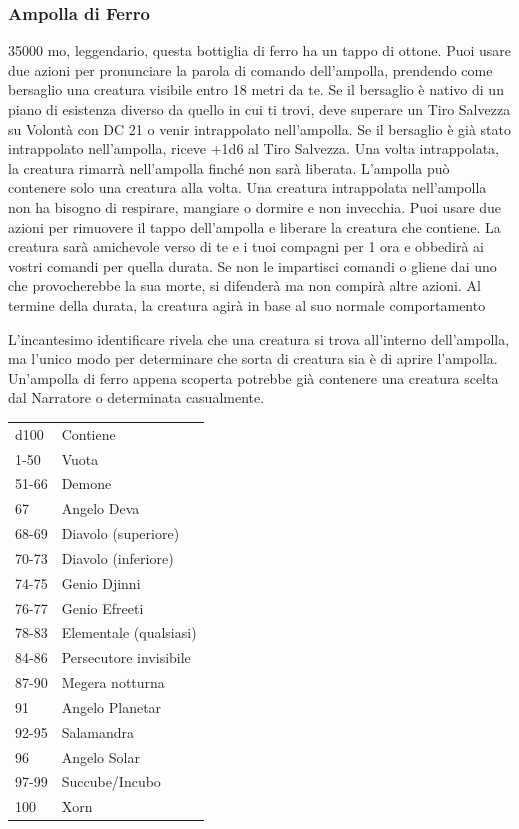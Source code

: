 \begin{multicols}{2}
\subsubsection*{Ampolla di Ferro}
35000 mo, leggendario, questa bottiglia di ferro ha un tappo di ottone. Puoi usare due azioni per pronunciare la parola di comando dell'ampolla, prendendo come bersaglio una creatura visibile entro 18 metri da te. Se il bersaglio è nativo di un piano di esistenza diverso da quello in cui ti trovi, deve superare un Tiro Salvezza su Volontà con DC 21 o venir intrappolato nell'ampolla. Se il bersaglio è già stato intrappolato nell'ampolla, riceve +1d6 al Tiro Salvezza. Una volta intrappolata, la creatura rimarrà nell'ampolla finché non sarà liberata. L'ampolla può contenere solo una creatura alla volta. Una creatura intrappolata nell'ampolla non ha bisogno di respirare, mangiare o dormire e non invecchia. Puoi usare due azioni per rimuovere il tappo dell'ampolla e liberare la creatura che contiene. La creatura sarà amichevole verso di te e i tuoi compagni per 1 ora e obbedirà ai vostri comandi per quella durata. Se non le impartisci comandi o gliene dai uno che provocherebbe la sua morte, si difenderà ma non compirà altre azioni. Al termine della durata, la creatura agirà in base al suo normale comportamento

L'incantesimo identificare rivela che una creatura si trova all'interno dell'ampolla, ma l'unico modo per determinare che sorta di creatura sia è di aprire l'ampolla. Un'ampolla di ferro appena scoperta potrebbe già contenere una creatura scelta dal Narratore o determinata casualmente.

\medskip

\begin{tabular}{ll}
\hline
d100 &Contiene\\
1-50 &Vuota\\
51-66 &Demone \\
67 &Angelo Deva\\
68-69 &Diavolo (superiore)\\
70-73 &Diavolo (inferiore)\\
74-75 &Genio Djinni\\
76-77 &Genio Efreeti\\
78-83 &Elementale (qualsiasi)\\
84-86 &Persecutore invisibile\\
87-90 &Megera notturna\\
91 &Angelo Planetar\\
92-95 &Salamandra\\
96 &Angelo Solar\\
97-99 &Succube/Incubo\\
100 &Xorn\\
\end{tabular}
\medskip



\end{multicols}

